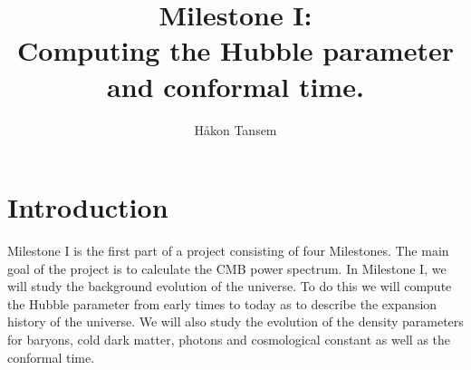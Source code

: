 \documentclass[onecolumn]{aastex62}
\begin{document}
\title{\Large Milestone I:\\Computing the Hubble parameter and conformal time.}





\author{Håkon Tansem}



\section{Introduction} \label{sec:intro}
Milestone I is the first part of a project consisting of four Milestones. The
main goal of the project is to calculate the CMB power spectrum. In
Milestone I, we will study the background evolution of the universe. To do this
we will compute the Hubble parameter from early times to today as
to describe the expansion history of the universe. We will also study the
evolution of the density parameters for baryons, cold dark matter, photons and
cosmological constant as well as the conformal time.
 
\end{document}
